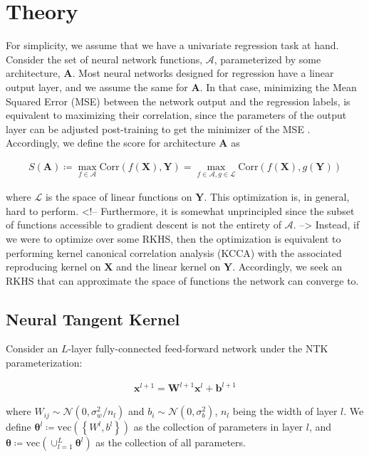 \documentclass[a4paper,12pt]{article}
\begin{document}
\section{Theory}

For simplicity, we assume that we have a univariate regression task at hand. Consider the set of neural network functions, $\mathcal{A}$, parameterized by some architecture, $\mathbf{A}$. Most neural networks designed for regression have a linear output layer, and we assume the same for $\mathbf{A}$. In that case, minimizing the Mean Squared Error (MSE) between the network output and the regression labels, is equivalent to maximizing their correlation, since the parameters of the output layer can be adjusted post-training to get the minimizer of the MSE \cite{englisch_1994_corr-mse}. Accordingly, we define the score for architecture $\mathbf{A}$ as

\begin{align}
  S\left(\mathbf{A}\right)
  \coloneqq \max_{f\in\mathcal{A}} \text{Corr}\left(f\left(\mathbf{X}\right), \mathbf{Y}\right)
  = \max_{f\in\mathcal{A}, g\in\mathcal{L}} \text{Corr}\left(f\left(\mathbf{X}\right), g\left(\mathbf{Y}\right)\right)
\end{align}

where $\mathcal{L}$ is the space of linear functions on $\mathbf{Y}$. This optimization is, in general, hard to perform. <!-- Furthermore, it is somewhat unprincipled since the subset of functions accessible to gradient descent is not the entirety of $\mathcal{A}$. -->
Instead, if we were to optimize over some RKHS, then the optimization is equivalent to performing kernel canonical correlation analysis (KCCA) with the associated reproducing kernel on $\mathbf{X}$ and the linear kernel on $\mathbf{Y}$. Accordingly, we seek an RKHS that can approximate the space of functions the network can converge to.

\subsection{Neural Tangent Kernel}

Consider an $L$-layer fully-connected feed-forward network under the NTK parameterization:

\begin{align}
  \mathbf{x}^{l+1} = \mathbf{W}^{l+1}\mathbf{x}^l + \mathbf{b}^{l+1}
\end{align}

where $W_{ij} \sim \mathcal{N}\left(0, \sigma_w^2/n_l\right)$ and $b_i \sim \mathcal{N}\left(0, \sigma_b^2\right)$, $n_l$ being the width of layer $l$. We define $\mathbf{\theta}^l \coloneqq \text{vec}\left(\left\{W^l,b^l\right\}\right)$ as the collection of parameters in layer $l$, and $\mathbf{\theta} \coloneqq \text{vec}\left(\cup_{l=1}^L \mathbf{\theta}^l \right)$ as the collection of all parameters.
\end{document}
